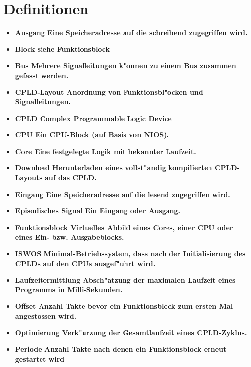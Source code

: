 \newcommand{\begriff}[2]
{\item \bfseries{#1} \textnormal{#2}}

\chapter {Definitionen}
\begin{itemize}

\begriff{Ausgang}{Eine Speicheradresse auf die schreibend zugegriffen
  wird.}

\begriff{Block}{siehe Funktionsblock}

\begriff{Bus}{Mehrere Signalleitungen k"onnen zu einem Bus zusammen
  gefasst werden.}

\begriff{CPLD-Layout}{Anordnung von Funktionsbl"ocken und Signalleitungen.}

\begriff{CPLD}{Complex Programmable Logic Device}

\begriff{CPU}{Ein CPU-Block (auf Basis von NIOS).}

\begriff{Core}{Eine festgelegte Logik mit bekannter Laufzeit.}

\begriff{Download}{Herunterladen eines vollst"andig kompilierten CPLD-Layouts
auf das CPLD.}

\begriff{Eingang}{Eine Speicheradresse auf die lesend zugegriffen wird.}

\begriff{Episodisches Signal}{Ein Eingang oder Ausgang.}

\begriff{Funktionsblock}{Virtuelles Abbild eines Cores, einer CPU oder
eines Ein- bzw. Ausgabeblocks.}

\begriff{ISWOS}{Minimal-Betriebssystem, dass nach der Initialisierung
  des CPLDs auf den CPUs ausgef"uhrt wird.}

\begriff{Laufzeitermittlung}{Absch"atzung der maximalen Laufzeit eines
  Programms in Milli-Sekunden.}

\begriff{Offset}{Anzahl Takte bevor ein Funktionsblock zum ersten Mal
  angestossen wird.}

\begriff{Optimierung}{Verk"urzung der Gesamtlaufzeit eines CPLD-Zyklus.}

\begriff{Periode}{Anzahl Takte nach denen ein Funktionsblock erneut
  gestartet wird}


\end{itemize}
